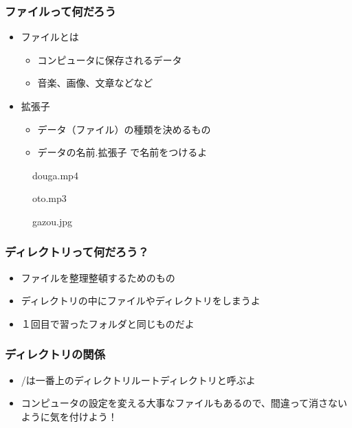 \begin{frame}
    \frametitle{ファイルって何だろう}
    \begin{itemize}
        \item ファイルとは
        \begin{itemize}
            \item コンピュータに保存されるデータ
            \item 音楽、画像、文章などなど
        \end{itemize}
        \item 拡張子
        \begin{itemize}
            \item データ（ファイル）の種類を決めるもの
            \item データの名前.拡張子 で名前をつけるよ
        \end{itemize}
    \end{itemize}
    \begin{figure}[!h]
        \centering
        
        \caption{douga.mp4}
    \end{figure}
    \begin{figure}[!h]
        \centering
        
        \caption{oto.mp3}
    \end{figure}
    \begin{figure}[!h]
        \centering
        
        \caption{gazou.jpg}
    \end{figure}
\end{frame}

\begin{frame}
    \frametitle{ディレクトリって何だろう？}
    \begin{itemize}
        \item ファイルを整理整頓するためのもの
        \item ディレクトリの中にファイルやディレクトリをしまうよ
        \item １回目で習ったフォルダと同じものだよ
    \end{itemize}
\end{frame}

\begin{frame}
    \frametitle{ディレクトリの関係}
    \begin{itemize}
        \item /は一番上のディレクトリルートディレクトリと呼ぶよ
        \item コンピュータの設定を変える大事なファイルもあるので、間違って消さないように気を付けよう！
    \end{itemize}
\end{frame}

